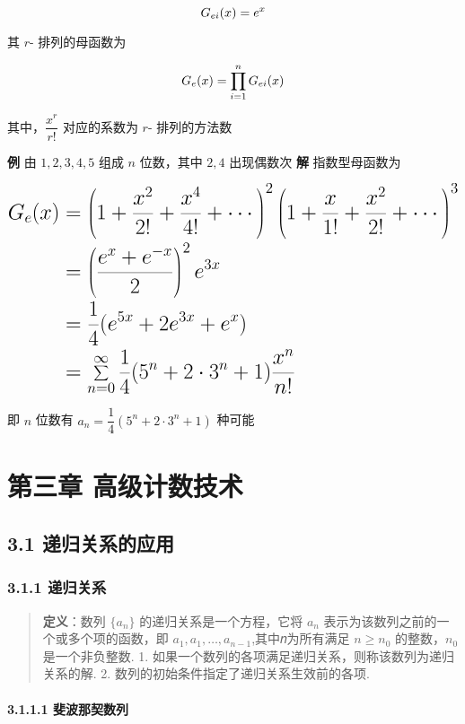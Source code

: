 \[
\huge G_{ei}(x)=e^x
\]

其 \(r\)- 排列的母函数为

\[
\huge G_e(x)=\prod_{i=1}^nG_{ei}(x)
\]

其中，\(\dfrac{x^r}{r!}\) 对应的系数为 \(r\)- 排列的方法数

\textbf{例} 由 \(1,2,3,4,5\) 组成 \(n\) 位数，其中 \(2,4\) 出现偶数次
\textbf{解} 指数型母函数为

\[
\huge
\begin{align}
G_e(x)&=\left(1+\dfrac{x^2}{2!}+\dfrac{x^4}{4!}+\cdots\right)^2\left(1+\dfrac{x}{1!}+\dfrac{x^2}{2!}+\cdots\right)^3\\
&=\left(\dfrac{e^x+e^{-x}}{2}\right)^2e^{3x}\\
&=\dfrac{1}{4}(e^{5x}+2e^{3x}+e^x)\\
&=\sum_{n=0}^\infty\dfrac{1}{4}(5^n+2\cdot3^n+1)\dfrac{x^n}{n!}
\end{align}
\]

即 \(n\) 位数有 \(a_n=\dfrac{1}{4}(5^n+2\cdot3^n+1)\) 种可能

\section{第三章
高级计数技术}\label{ux7b2cux4e09ux7ae0-ux9ad8ux7ea7ux8ba1ux6570ux6280ux672f}

\subsection{3.1
递归关系的应用}\label{ux9012ux5f52ux5173ux7cfbux7684ux5e94ux7528}

\subsubsection{3.1.1 递归关系}\label{ux9012ux5f52ux5173ux7cfb}

\begin{quote}
\textbf{定义}：数列 \(\{ a_n\}\) 的递归关系是一个方程，它将 \(a_n\)
表示为该数列之前的一个或多个项的函数，即
\(a_1, a_1, …,a_{n-1}\),其中𝑛为所有满足 \(n \geq n_0\) 的整数，\(n_0\)
是一个非负整数. 1.
如果一个数列的各项满足递归关系，则称该数列为递归关系的解. 2.
数列的初始条件指定了递归关系生效前的各项.
\end{quote}

\paragraph{3.1.1.1
斐波那契数列}\label{ux6590ux6ce2ux90a3ux5951ux6570ux5217}

